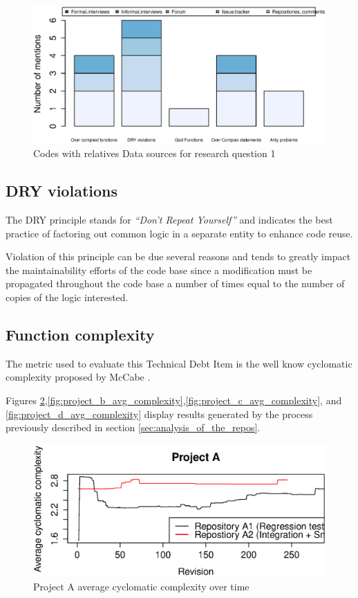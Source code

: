 \begin{figure}[!htbp]
    \centering
    \includegraphics[width=\textwidth,keepaspectratio]{figure/results/rq1/sources.eps}
    \caption{Codes with relatives Data sources for research question 1}
    \label{fig:rq1_sources}
\end{figure}


\subsection{DRY violations}
The DRY principle stands for \textit{``Don't Repeat Yourself''} and indicates the best practice of factoring out common logic in a separate entity to enhance code reuse.

Violation of this principle can be due several reasons and tends to greatly impact the maintainability efforts of the code base since a modification must be propagated throughout the code base a number of times equal to the number of copies of the logic interested.
    
\subsection{Function complexity}
The metric used to evaluate this Technical Debt Item is the well know cyclomatic complexity proposed by McCabe \cite{cyclomatic_complexity}.


    Figures \ref{fig:project_a_avg_complexity},\ref{fig:project_b_avg_complexity},\ref{fig:project_c_avg_complexity}, and \ref{fig:project_d_avg_complexity} display results generated by the process previously described in section \ref{sec:analysis_of_the_repos}.

    
\begin{figure}[!htbp]
    \centering
    \includegraphics[width=\textwidth,keepaspectratio]{figure/results/rq1/project_a_avg_complexity.eps}
    \caption{Project A average cyclomatic complexity over time}
    \label{fig:project_a_avg_complexity}
\end{figure}

